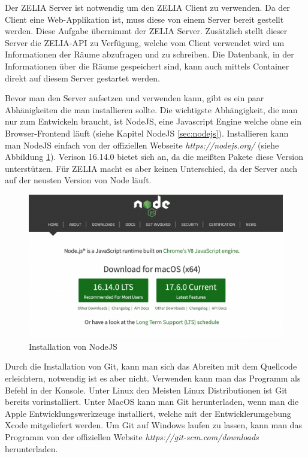 
Der ZELIA Server ist notwendig um den ZELIA Client zu verwenden. Da der Client eine Web-Applikation ist, muss diese von einem Server bereit gestellt werden. Diese Aufgabe übernimmt der ZELIA Server. Zusätzlich stellt dieser Server die ZELIA-API zu Verfügung, welche vom Client verwendet wird um Informationen der Räume abzufragen und zu schreiben. Die Datenbank, in der Informationen über die Räume gespeichert sind, kann auch mittels Container direkt auf diesem Server gestartet werden.



Bevor man den Server aufsetzen und verwenden kann, gibt es ein paar Abhänigkeiten die man installieren sollte. Die wichtigste Abhängigkeit, die man nur zum Entwickeln braucht, ist NodeJS, eine Javascript Engine welche ohne ein Browser-Frontend läuft (siehe Kapitel NodeJS \ref{sec:nodejs}). Installieren kann man NodeJS einfach von der offiziellen Webseite \emph{https://nodejs.org/} (siehe Abbildung \ref{fig:nodejsdownload}). Verison 16.14.0 bietet sich an, da die meißten Pakete diese Version unterstützen. Für ZELIA macht es aber keinen Unterschied, da der Server auch auf der neusten Version von Node läuft.

\begin{figure}[H]
    \centering
    \includegraphics[width=120mm]{media/Handbuch/nodejs.png}
    \caption{Installation von NodeJS}
    \label{fig:nodejsdownload}
\end{figure}


Durch die Installation von Git, kann man sich das Abreiten mit dem Quellcode erleichtern, notwendig ist es aber nicht. Verwenden kann man das Programm als Befehl in der Konsole. Unter Linux den Meisten Linux Distributionen ist Git bereits vorinstalliert. Unter MacOS kann man Git herunterladen, wenn man die Apple Entwicklungswerkzeuge installiert, welche mit der Entwicklerumgebung Xcode mitgeliefert werden. Um Git auf Windows laufen zu lassen, kann man das Programm von der offiziellen Website \emph{https://git-scm.com/downloads} herunterladen.

